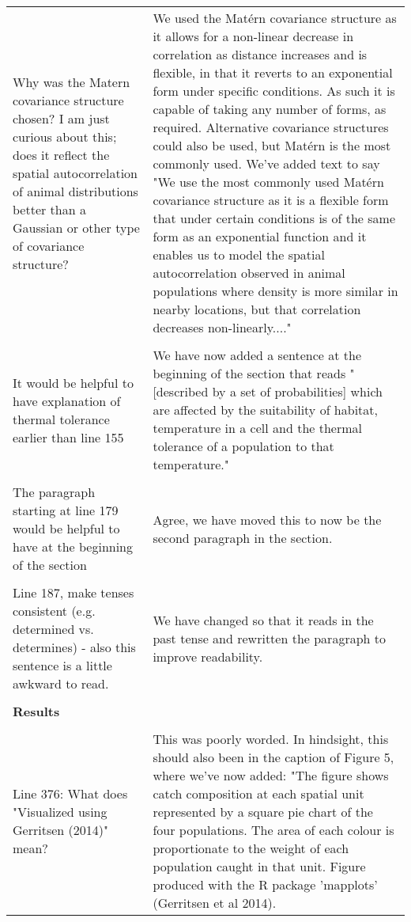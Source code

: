 \documentclass[10pt]{letter}
\begin{document}
\begin{landscape}
\begin{center}
\begin{longtable}{p{12cm} | p{12cm}}
\\
Why was the Matern covariance structure chosen? I am just curious about this;
does it reflect the spatial autocorrelation of animal distributions better than
a Gaussian or other type of covariance structure? & We used the Matérn
covariance structure as it allows for a non-linear decrease in correlation as
distance increases and is flexible, in that it reverts to an exponential form
under specific conditions. As such it is capable of taking any number of forms,
as required. Alternative covariance structures could also be used, but Matérn
is the most commonly used. We've added text to say "We use the most commonly
used Matérn covariance structure as it is a flexible form that under certain
conditions is of the same form as an exponential function and it enables us to
model the spatial autocorrelation observed in animal populations where density
is more similar in nearby locations, but that correlation decreases
non-linearly...." \\ 
\\
It would be helpful to have explanation of thermal tolerance earlier than line
155 & We have now added a sentence at the beginning of the section that reads
"[described by a set of probabilities] which are affected by the suitability of
habitat, temperature in a cell and the thermal tolerance of a population to
that temperature." \\
\\
The paragraph starting at line 179 would be helpful to have at the beginning of
the section & Agree, we have moved this to now be the second paragraph in the
section. \\
\\
Line 187, make tenses consistent (e.g. determined vs. determines) - also this
sentence is a little awkward to read. & We have changed so that it reads in the
past tense and rewritten the paragraph to improve readability. \\
\\
		\hline
		\textbf{Results} &  \\
\\
Line 376: What does "Visualized using Gerritsen (2014)" mean? & This was poorly
worded. In hindsight, this should also been in the caption of Figure 5, where
we've now added: "The figure shows catch composition at each spatial unit
represented by a square pie chart of the four populations. The area of each
colour is proportionate to the weight of each population caught in that unit.
Figure produced with the R package 'mapplots' (Gerritsen et al 2014). \\

\end{longtable}
\end{center}
\end{landscape}
\end{document}
